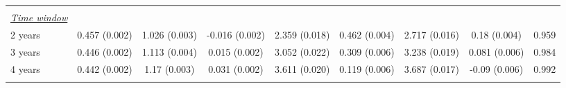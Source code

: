 \begin{tabular}{@{\extracolsep{5pt}} l cccccccc}
 &   &   &   &   &   &   &   &  \\ 
\underline{{\it Time window}} &   &   &   &   &   &   &   &  \\ 
2 years & 0.457 (0.002) & 1.026 (0.003) & -0.016 (0.002) & 2.359 (0.018) & 0.462 (0.004) & 2.717 (0.016) & 0.18 (0.004) & 0.959 \\ 
3 years & 0.446 (0.002) & 1.113 (0.004) & 0.015 (0.002) & 3.052 (0.022) & 0.309 (0.006) & 3.238 (0.019) & 0.081 (0.006) & 0.984 \\ 
4 years & 0.442 (0.002) & 1.17 (0.003) & 0.031 (0.002) & 3.611 (0.020) & 0.119 (0.006) & 3.687 (0.017) & -0.09 (0.006) & 0.992 \\ 
\hline \\[-1.8ex] 
\end{tabular} 
